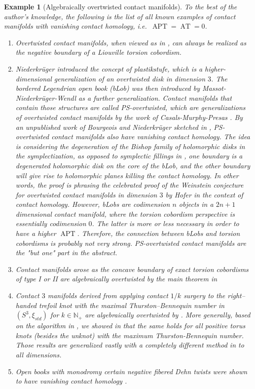 \documentclass[11pt]{amsart}
\numberwithin{equation}{section}
\newtheorem{example}[theorem]{\textbf{Example}}
\def\N{{\mathbb N}}
\DeclareMathOperator{\APT}{APT}
\DeclareMathOperator{\AT}{AT}
\begin{document}
\begin{example}[Algebraically overtwisted contact manifolds]
To the best of the author's knowledge, the following is the list of all known examples of contact manifolds with vanishing contact homology, i.e.\ $\APT=\AT=0$.
\begin{enumerate}
    \item Overtwisted contact manifolds, when viewed as in , can always be realized as the negative boundary of a Liouville torsion cobordism. 
    \item Niederkr\"uger  \cite{Nie06} introduced the concept of plastikstufe, which is a higher-dimensional generalization of an overtwisted disk in dimension $3$. The bordered Legendrian open book (bLob) was then introduced by Massot-Niederkr\"uger-Wendl \cite{MNW} as a further generalization. Contact manifolds that contain those structures are called PS-overtwisted, which are generalizations of overtwisted contact manifolds by the work of Casals-Murphy-Presas \cite[Theorem 1.1-(4)]{zbMATH07010365}. By an unpublished work of Bourgeois and Niederkr\"uger sketched in  \cite[Theorem 4.10]{zbMATH05635066}, PS-overtwisted contact manifolds also have vanishing contact homology. The idea is considering the degeneration of the Bishop family of holomorphic disks in the symplectization, as opposed to symplectic fillings in \cite{Nie06}, one boundary is a degenerated holomorphic disk on the core of the bLob, and the other boundary will give rise to holomorphic planes killing the contact homology. In other words, the proof is phrasing the celebrated proof of the Weinstein conjecture for overtwisted contact manifolds in dimension $3$ by Hofer \cite{zbMATH00549637} in the context of contact homology. However, bLobs are codimension $n$ objects in a $2n+1$ dimensional contact manifold, where the torsion cobordism perspective is essentially codimension $0$. The latter is more or less necessary in order to have a higher $\APT$. Therefore, the connection between bLobs and torsion cobordisms is probably not very strong. PS-overtwisted contact manifolds are the "but one" part in the abstract.
    \item Contact manifolds arose as the concave boundary of \emph{exact} torsion cobordisms of type I or II are algebraically overtwisted by the main theorem in \cite{+1} 
    \item Contact $3$ manifolds derived from applying contact $1/k$ surgery to the right–handed trefoil knot with the maximal Thurston–Bennequin number in $(S^3,\xi_{std})$ for $k\in \N_+$ are algebraically overtwisted by \cite{zbMATH07699409}. More generally, based on the algorithm in \cite{zbMATH07699409}, we showed in \cite{zbMATH07983165} that the same holds for all positive torus knots (besides the unknot) with the maximum Thurston-Bennequin number. Those results are generalized vastly with a completely different method in \cite{AOT} to all dimensions. 
    \item Open books with monodromy certain negative fibered Dehn twists were shown to have vanishing contact homology \cite{zbMATH06359114,zbMATH06562001}.
\end{enumerate}
\end{example}
\end{document}
